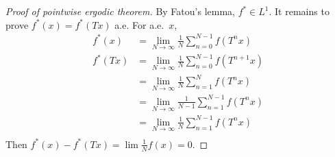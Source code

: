 \documentclass{article}
\begin{document}
\begin{proof}[Proof of pointwise ergodic theorem]
  By Fatou's lemma, $f^* \in L^1$.
  It remains to prove $f^*(x) = f^*(Tx)$ a.e.
  For a.e.\ $x$,
  \begin{align*}
    f^*(x) &= \lim_{N \to \infty} \frac{1}{N} \sum_{n=0}^{N-1} f(T^n x) \\
    f^*(Tx) &= \lim_{N \to \infty} \frac{1}{N} \sum_{n=0}^{N-1} f(T^{n+1} x) \\
     &= \lim_{N \to \infty} \frac{1}{N} \sum_{n=1}^{N} f(T^n x) \\
     &= \lim_{N \to \infty} \frac{1}{N-1} \sum_{n=1}^{N-1} f(T^n x) \\
     &= \lim_{N \to \infty} \frac{1}{N} \sum_{n=1}^{N-1} f(T^n x) \\
  \end{align*}
  Then $f^*(x) - f^*(Tx) = \lim \frac{1}{N} f(x) = 0$.
\end{proof}
\printindex
\end{document}
